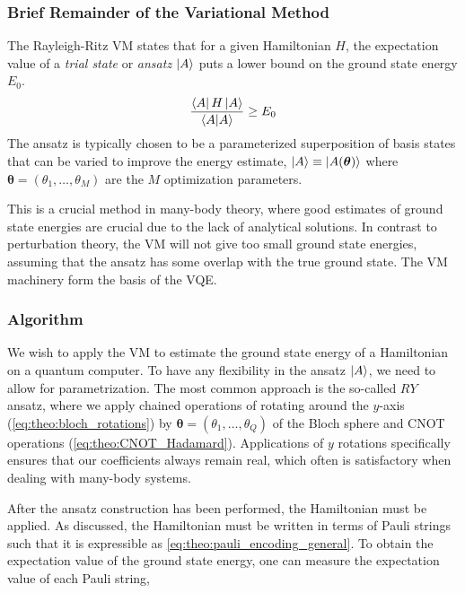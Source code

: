 \subsubsection{Brief Remainder of the Variational Method}
The Rayleigh-Ritz VM states that for a given Hamiltonian $H$, the expectation value of a \textit{trial state} or \textit{ansatz} $\ket{A}$ puts a lower bound on the ground state energy $E_0$.
\begin{equation}
    \frac{\bra{A}H\ket{A}}{\ip{A}} \geq E_0
\end{equation}
The ansatz is typically chosen to be a parameterized superposition of basis states that can be varied to improve the energy estimate, $\ket{A}\equiv \ket{A(\boldsymbol{\theta})}$ where $\boldsymbol{\theta} = (\theta_1, \ldots, \theta_M)$ are the $M$ optimization parameters.

This is a crucial method in many-body theory, where good estimates of ground state energies are crucial due to the lack of analytical solutions. In contrast to perturbation theory, the VM will not give too small ground state energies, assuming that the ansatz has some overlap with the true ground state. The VM machinery form the basis of the VQE. 

\subsubsection{Algorithm}
We wish to apply the VM to estimate the ground state energy of a Hamiltonian on a quantum computer. To have any flexibility in the ansatz $\ket{A}$, we need to allow for parametrization. The most common approach is the so-called $RY$ ansatz, where we apply chained operations of rotating around the $y$-axis (\cref{eq:theo:bloch_rotations}) by $\boldsymbol{\theta} = (\theta_1,\ldots,\theta_Q)$ of the Bloch sphere and CNOT operations (\cref{eq:theo:CNOT_Hadamard}). Applications of $y$ rotations specifically ensures that our coefficients always remain real, which often is satisfactory when dealing with many-body systems. 

After the ansatz construction has been performed, the Hamiltonian must be applied. As discussed, the Hamiltonian must be written in terms of Pauli strings such that it is expressible as \cref{eq:theo:pauli_encoding_general}. To obtain the expectation value of the ground state energy, one can measure the expectation value of each Pauli string,

